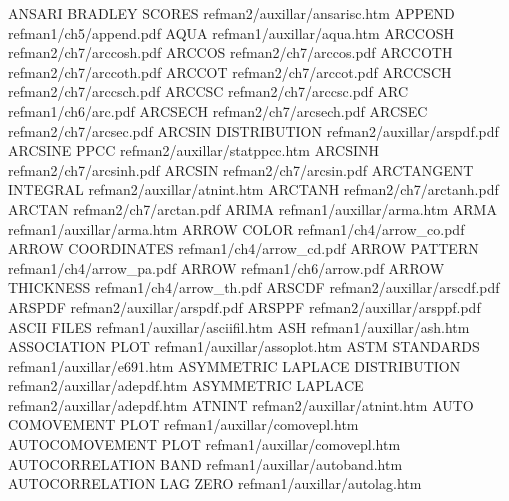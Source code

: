ANSARI BRADLEY SCORES                   refman2/auxillar/ansarisc.htm
APPEND                                  refman1/ch5/append.pdf
AQUA                                    refman1/auxillar/aqua.htm
ARCCOSH                                 refman2/ch7/arccosh.pdf
ARCCOS                                  refman2/ch7/arccos.pdf
ARCCOTH                                 refman2/ch7/arccoth.pdf
ARCCOT                                  refman2/ch7/arccot.pdf
ARCCSCH                                 refman2/ch7/arccsch.pdf
ARCCSC                                  refman2/ch7/arccsc.pdf
ARC                                     refman1/ch6/arc.pdf
ARCSECH                                 refman2/ch7/arcsech.pdf
ARCSEC                                  refman2/ch7/arcsec.pdf
ARCSIN DISTRIBUTION                     refman2/auxillar/arspdf.pdf
ARCSINE PPCC                            refman2/auxillar/statppcc.htm
ARCSINH                                 refman2/ch7/arcsinh.pdf
ARCSIN                                  refman2/ch7/arcsin.pdf
ARCTANGENT INTEGRAL                     refman2/auxillar/atnint.htm
ARCTANH                                 refman2/ch7/arctanh.pdf
ARCTAN                                  refman2/ch7/arctan.pdf
ARIMA                                   refman1/auxillar/arma.htm
ARMA                                    refman1/auxillar/arma.htm
ARROW COLOR                             refman1/ch4/arrow_co.pdf
ARROW COORDINATES                       refman1/ch4/arrow_cd.pdf
ARROW PATTERN                           refman1/ch4/arrow_pa.pdf
ARROW                                   refman1/ch6/arrow.pdf
ARROW THICKNESS                         refman1/ch4/arrow_th.pdf
ARSCDF                                  refman2/auxillar/arscdf.pdf
ARSPDF                                  refman2/auxillar/arspdf.pdf
ARSPPF                                  refman2/auxillar/arsppf.pdf
ASCII FILES                             refman1/auxillar/asciifil.htm
ASH                                     refman1/auxillar/ash.htm
ASSOCIATION PLOT                        refman1/auxillar/assoplot.htm
ASTM STANDARDS                          refman1/auxillar/e691.htm
ASYMMETRIC LAPLACE DISTRIBUTION         refman2/auxillar/adepdf.htm
ASYMMETRIC LAPLACE                      refman2/auxillar/adepdf.htm
ATNINT                                  refman2/auxillar/atnint.htm
AUTO COMOVEMENT PLOT                    refman1/auxillar/comovepl.htm
AUTOCOMOVEMENT PLOT                     refman1/auxillar/comovepl.htm
AUTOCORRELATION BAND                    refman1/auxillar/autoband.htm
AUTOCORRELATION LAG ZERO                refman1/auxillar/autolag.htm
